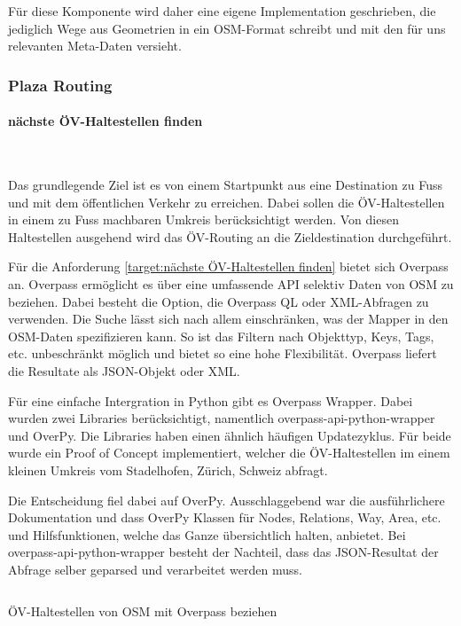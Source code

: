Für diese Komponente wird daher eine eigene Implementation geschrieben, die jediglich Wege aus Geometrien in ein \ac{OSM}-Format schreibt und mit den für uns relevanten Meta-Daten versieht.

\subsubsection{Plaza Routing}
\label{architektur:Plaza Routing}

\paragraph{nächste ÖV-Haltestellen finden}~\\
\label{architektur:nächste ÖV-Haltestellen finden}

Das grundlegende Ziel ist es von einem Startpunkt aus eine Destination zu Fuss und mit dem öffentlichen Verkehr zu erreichen. Dabei sollen die ÖV-Haltestellen in einem zu Fuss machbaren Umkreis berücksichtigt werden. Von diesen Haltestellen ausgehend wird das ÖV-Routing an die Zieldestination durchgeführt.

Für die Anforderung \ref{target:nächste ÖV-Haltestellen finden} bietet sich Overpass an. Overpass ermöglicht es über eine umfassende \ac{API} selektiv Daten von \ac{OSM} zu beziehen. Dabei besteht die Option, die Overpass \ac{QL} oder XML-Abfragen zu verwenden. Die Suche lässt sich nach allem einschränken, was der Mapper in den \ac{OSM}-Daten spezifizieren kann. So ist das Filtern nach Objekttyp, Keys, Tags, etc. unbeschränkt möglich und bietet so eine hohe Flexibilität. Overpass liefert die Resultate als JSON-Objekt oder XML. 

Für eine einfache Intergration in Python gibt es Overpass Wrapper. Dabei wurden zwei Libraries berücksichtigt, namentlich overpass-api-python-wrapper und OverPy. Die Libraries haben einen ähnlich häufigen Updatezyklus. Für beide wurde ein Proof of Concept implementiert, welcher die ÖV-Haltestellen im einem kleinen Umkreis vom Stadelhofen, Zürich, Schweiz abfragt.

Die Entscheidung fiel dabei auf OverPy. Ausschlaggebend war die ausführlichere Dokumentation und dass OverPy Klassen für Nodes, Relations, Way, Area, etc. und Hilfsfunktionen, welche das Ganze übersichtlich halten, anbietet. Bei overpass-api-python-wrapper besteht der Nachteil, dass das JSON-Resultat der Abfrage selber geparsed und verarbeitet werden muss.

\begin{listing}[ht]
    \inputminted{python}{projectdoc/listing/get_public_transport_stops_overpass.py}
    \caption{ÖV-Haltestellen von \acs{OSM} mit Overpass beziehen}
    \label{get_public_transport_stops_overpass}
\end{listing}

